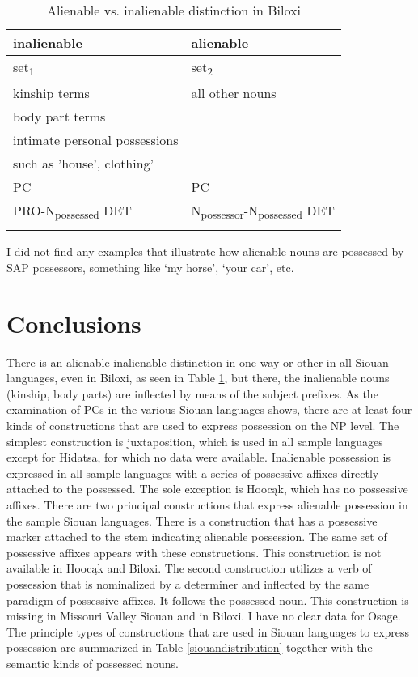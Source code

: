 \documentclass[output=paper]{LSP/langsci}
\begin{document}
\begin{table}
\caption{Alienable vs. inalienable distinction in Biloxi} \label{biloxialienability}
\begin{tabular}[h!]{ l l }
\lsptoprule
inalienable & alienable \\
\midrule
set\textsubscript{1} & set\textsubscript{2} \\
\hline
kinship terms & all other nouns \\
body part terms &  \\
intimate personal possessions & \\
such as 'house', clothing' & \\	
\hline
PC &	PC \\
\hline
PRO-N\textsubscript{possessed} DET & N\textsubscript{possessor}-N\textsubscript{possessed} DET \\
\lspbottomrule
\end{tabular}
\end{table}

I did not find any examples that illustrate how alienable nouns are possessed by SAP possessors, something like `my horse', `your car', etc.

\section{Conclusions}
There is an alienable-inalienable distinction in one way or other in all Siouan languages, even in Biloxi, as seen in Table \ref{biloxialienability}, but there, the inalienable nouns (kinship, body parts) are inflected by means of the subject prefixes. As the examination of PCs in the various Siouan languages shows, there are at least four kinds of constructions that are used to express possession on the NP level. The simplest construction is  juxtaposition, which is used in all sample languages except for Hidatsa, for which no data were available. Inalienable possession is expressed in all sample languages with a series of possessive affixes directly attached to the possessed. The sole exception is Hoocąk, which has no possessive affixes. There are two principal constructions that express alienable possession in the sample Siouan languages. There is a construction that has a possessive marker attached to the stem indicating alienable possession. The same set of possessive affixes appears with these constructions. This construction is not available in Hoocąk and Biloxi. The second construction utilizes a verb of possession that is nominalized by a determiner and inflected by the same paradigm of possessive affixes. It follows the possessed noun. This construction is missing in Missouri Valley Siouan and in Biloxi. I have no clear data for Osage. The principle types of constructions that are used in Siouan languages to express possession are summarized in Table \ref{siouandistribution} together with the semantic kinds of possessed nouns. 
\end{document}
